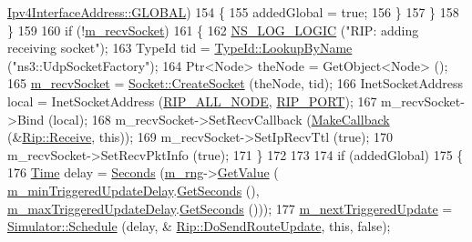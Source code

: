 \begin{DoxyCode}
      \hyperlink{classns3_1_1Ipv4InterfaceAddress_a329cea433e74f717c26c9e51c4fcd3d8ae144856017bcfb529872c91204d462b2}{Ipv4InterfaceAddress::GLOBAL})
154             \{
155               addedGlobal = \textcolor{keyword}{true};
156             \}
157         \}
158     \}
159 
160   \textcolor{keywordflow}{if} (!\hyperlink{classns3_1_1Rip_a6c5dc1b74475e3caa0782f37b722be6b}{m\_recvSocket})
161     \{
162       \hyperlink{group__logging_ga88acd260151caf2db9c0fc84997f45ce}{NS\_LOG\_LOGIC} (\textcolor{stringliteral}{"RIP: adding receiving socket"});
163       TypeId tid = \hyperlink{classns3_1_1TypeId_a119cf99c20931fdc294602cd360b180e}{TypeId::LookupByName} (\textcolor{stringliteral}{"ns3::UdpSocketFactory"});
164       Ptr<Node> theNode = GetObject<Node> ();
165       \hyperlink{classns3_1_1Rip_a6c5dc1b74475e3caa0782f37b722be6b}{m\_recvSocket} = \hyperlink{classns3_1_1Socket_ad448a62bb50ad3dbac59c879a885a8d2}{Socket::CreateSocket} (theNode, tid);
166       InetSocketAddress local = InetSocketAddress (\hyperlink{rip_8cc_a4088e07a51c9aabba6666b6c1e85f704}{RIP\_ALL\_NODE}, 
      \hyperlink{rip_8cc_a6af26a435808c34ee4f8876792a5682a}{RIP\_PORT});
167       m\_recvSocket->Bind (local);
168       m\_recvSocket->SetRecvCallback (\hyperlink{group__makecallbackmemptr_ga9376283685aa99d204048d6a4b7610a4}{MakeCallback} (&\hyperlink{classns3_1_1Rip_a49acadfb3b533118276481a0d231406e}{Rip::Receive}, \textcolor{keyword}{this}));
169       m\_recvSocket->SetIpRecvTtl (\textcolor{keyword}{true});
170       m\_recvSocket->SetRecvPktInfo (\textcolor{keyword}{true});
171     \}
172 
173 
174   \textcolor{keywordflow}{if} (addedGlobal)
175     \{
176       \hyperlink{namespacens3_1_1TracedValueCallback_a7ffd3e7c142ffe7c8a1d2db9b8de38ec}{Time} delay = \hyperlink{group__timecivil_ga33c34b816f8ff6628e33d5c8e9713b9e}{Seconds} (\hyperlink{classns3_1_1Rip_aff68d9a9e912bc0a99201bee4d93e636}{m\_rng}->\hyperlink{classns3_1_1UniformRandomVariable_a03822d8c86ac51e9aa83bbc73041386b}{GetValue} (
      \hyperlink{classns3_1_1Rip_a9345ff42e947fb0edb2382d6c4f50bd0}{m\_minTriggeredUpdateDelay}.\hyperlink{classns3_1_1Time_a8f20d5c3b0902d7b4320982f340b57c8}{GetSeconds} (), 
      \hyperlink{classns3_1_1Rip_aed7be1d33584f7d7f8b2ca68bfbf3a06}{m\_maxTriggeredUpdateDelay}.\hyperlink{classns3_1_1Time_a8f20d5c3b0902d7b4320982f340b57c8}{GetSeconds} ()));
177       \hyperlink{classns3_1_1Rip_a66c28747adb18044611ceab7fbba57a8}{m\_nextTriggeredUpdate} = \hyperlink{classns3_1_1Simulator_a671882c894a08af4a5e91181bf1eec13}{Simulator::Schedule} (delay, &
      \hyperlink{classns3_1_1Rip_a106f73869862c38c070faec379542e05}{Rip::DoSendRouteUpdate}, \textcolor{keyword}{this}, \textcolor{keyword}{false});

\end{DoxyCode}
